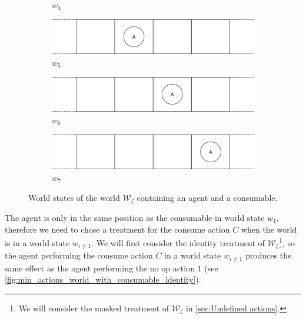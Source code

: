 \begin{figure}[H]
\begin{subfigure}{0.48\textwidth}
    \caption{$w_{4}$}
    \label{fig:w4}
  \end{subfigure}%
  \hfill
  \begin{subfigure}{0.48\textwidth}
    \centering
    \includegraphics[width=\textwidth]{5BeyondSBDRL/GlobalAlgebras/Images/Consumable_world_states/w5.png}
    \caption{$w_{5}$}
    \label{fig:w5}
  \end{subfigure}%
  \vspace{0.5cm}
  \begin{subfigure}{0.48\textwidth}
    \centering
    \includegraphics[width=\textwidth]{5BeyondSBDRL/GlobalAlgebras/Images/Consumable_world_states/w6.png}
    \caption{$w_{6}$}
    \label{fig:w6}
  \end{subfigure}%
  \hfill
  \begin{subfigure}{0.48\textwidth}
    \centering
    \includegraphics[width=\textwidth]{5BeyondSBDRL/GlobalAlgebras/Images/Consumable_world_states/w7.png}
    \caption{$w_{7}$}
    \label{fig:w7}
  \end{subfigure}%
  
  \caption{
  World states of the world $\mathscr{W}_{\zeta}$ containing an agent and a consumable.
  }
  \label{fig:4x1_consumable_world_states}
\end{figure}

The agent is only in the same position as the consumable in world state $w_{1}$, therefore we need to chose a treatment for the consume action $C$ when the world is in a world state $w_{i \neq 1}$.
We will first consider the identity treatment of $\mathscr{W}_{\zeta}$\footnote{
We will consider the masked treatment of $\mathscr{W}_{\zeta}$ in \cref{sec:Undefined actions}.
}, so the agent performing the consume action $C$ in a world state $w_{i \neq 1}$ produces the same effect as the agent performing the no op action $1$ (see \cref{fig:min_actions_world_with_consumable_identity}).

